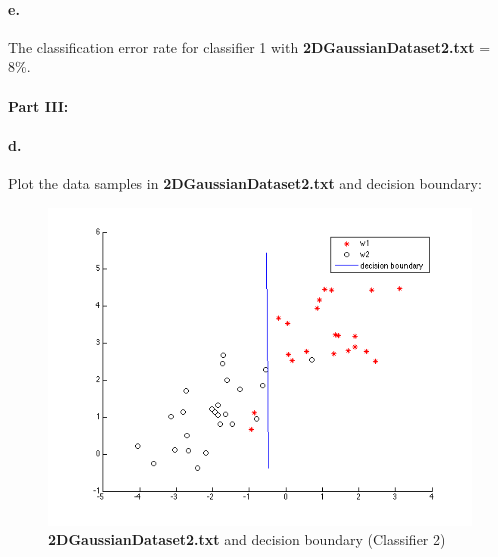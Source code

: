 \documentclass[a4paper]{article}
\begin{document}
\paragraph{e.} The classification error rate for classifier 1 with \textbf{2DGaussianDataset2.txt} = 8\%.

\paragraph{Part III:}
\paragraph{d.} Plot the data samples in \textbf{2DGaussianDataset2.txt} and decision boundary: \\
\begin{figure}[H]
  \centering
    \includegraphics[scale=.6]{images/3_d.png}
  \caption{\textbf{2DGaussianDataset2.txt} and decision boundary (Classifier 2)}
\end{figure}
\end{document}
